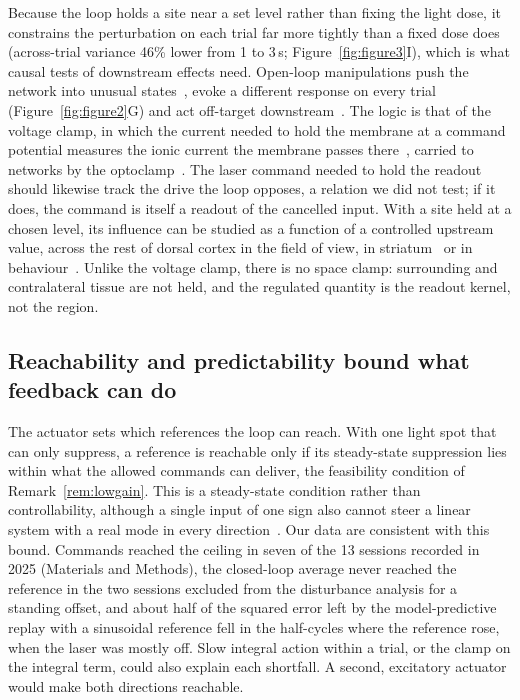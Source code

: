 Because the loop holds a site near a set level rather than fixing the light dose, it constrains the perturbation on each trial far more tightly than a fixed dose does (across-trial variance 46\% lower from 1 to 3\,s; Figure~\ref{fig:figure3}I), which is what causal tests of downstream effects need. Open-loop manipulations push the network into unusual states~\citep{Wolff2018}, evoke a different response on every trial (Figure~\ref{fig:figure2}G) and act off-target downstream~\citep{otchy2015acute}. The logic is that of the voltage clamp, in which the current needed to hold the membrane at a command potential measures the ionic current the membrane passes there~\citep{hodgkin1952measurement}, carried to networks by the optoclamp~\citep{newman2015optogenetic}. The laser command needed to hold the readout should likewise track the drive the loop opposes, a relation we did not test; if it does, the command is itself a readout of the cancelled input. With a site held at a chosen level, its influence can be studied as a function of a controlled upstream value, across the rest of dorsal cortex in the field of view, in striatum~\citep{Peters2021} or in behaviour~\citep{ZatkaHaas2021}. Unlike the voltage clamp, there is no space clamp: surrounding and contralateral tissue are not held, and the regulated quantity is the readout kernel, not the region.

\subsection*{Reachability and predictability bound what feedback can do}

The actuator sets which references the loop can reach. With one light spot that can only suppress, a reference is reachable only if its steady-state suppression lies within what the allowed commands can deliver, the feasibility condition of Remark~\ref{rem:lowgain}. This is a steady-state condition rather than controllability, although a single input of one sign also cannot steer a linear system with a real mode in every direction~\citep{brammer1972controllability}. Our data are consistent with this bound. Commands reached the ceiling in seven of the 13 sessions recorded in 2025 (Materials and Methods), the closed-loop average never reached the reference in the two sessions excluded from the disturbance analysis for a standing offset, and about half of the squared error left by the model-predictive replay with a sinusoidal reference fell in the half-cycles where the reference rose, when the laser was mostly off. Slow integral action within a trial, or the clamp on the integral term, could also explain each shortfall. A second, excitatory actuator would make both directions reachable.

